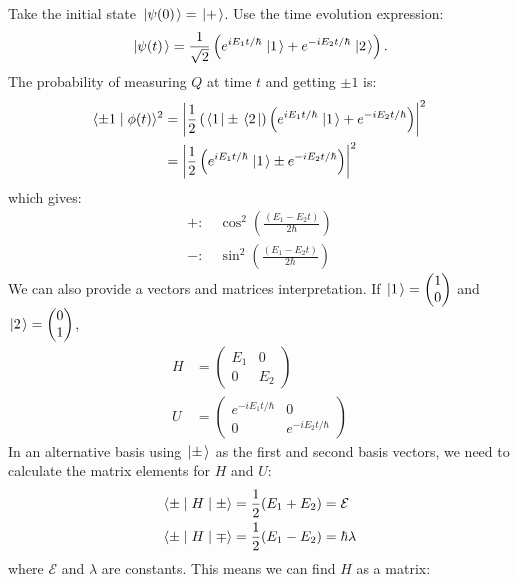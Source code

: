 \documentclass[../Main.tex]{subfiles}
\begin{document}
\begin{example}
    Take the initial state $\left.\left|\psi(0)\right.\right\rangle = \left.\left|+\right.\right\rangle$. Use the time evolution expression:
    \begin{equation*}
        \left.\left|\psi(t)\right.\right\rangle = \frac1{\sqrt{2}} \left(e^{iE_1 t / \hbar}\left.\left|1\right.\right\rangle + e^{-iE_2 t / \hbar} \left.\left|2\right.\right\rangle\right).
    \end{equation*}
    The probability of measuring $Q$ at time $t$ and getting $\pm 1$ is:
    \begin{align*}
        \langle\pm 1\mid\phi(t)\rangle^2 &= \left|\frac12 \left(\left.\left\langle1\right.\right| \pm \left.\left\langle2\right.\right|\right) \left(e^{iE_1 t / \hbar} \left.\left|1\right.\right\rangle + e^{-iE_2 t / \hbar}\right)\right|^2 \\
        &= \left|\frac12\left(e^{iE_1 t / \hbar} \left.\left|1\right.\right\rangle \pm e^{-iE_2 t / \hbar}\right)\right|^2 \\
    \end{align*}
    which gives:
    \begin{align*}
        +: &~\cos^2\left(\frac{(E_1 - E_2 t)}{2\hbar}\right) \\
        -: &~\sin^2\left(\frac{(E_1 - E_2 t)}{2\hbar}\right)
    \end{align*}
    We can also provide a vectors and matrices interpretation. If $\left.\left|1\right.\right\rangle = \begin{pmatrix}1 \\ 0\end{pmatrix}$ and $\left.\left|2\right.\right\rangle = \begin{pmatrix}0 \\ 1\end{pmatrix}$,
    \begin{align*}
        H &= \begin{pmatrix}
            E_1 & 0 \\
            0 & E_2
        \end{pmatrix}
        \\
        U &= \begin{pmatrix}
            e^{-i E_1 t / \hbar} & 0 \\
            0 & e^{-i E_2 t / \hbar}
        \end{pmatrix}
    \end{align*}
    In an alternative basis using $\left.\left|\pm\right.\right\rangle$ as the first and second basis vectors, we need to calculate the matrix elements for $H$ and $U$:
    \begin{align*}
        \langle\pm\mid H\mid\pm\rangle &= \frac12 (E_1 + E_2) = \mathcal{E} \\
        \langle\pm\mid H\mid\mp\rangle &= \frac12 (E_1 - E_2) = \hbar \lambda
    \end{align*}
    where $\mathcal{E}$ and $\lambda$ are constants. This means we can find $H$ as a matrix:

\end{example}
\end{document}
